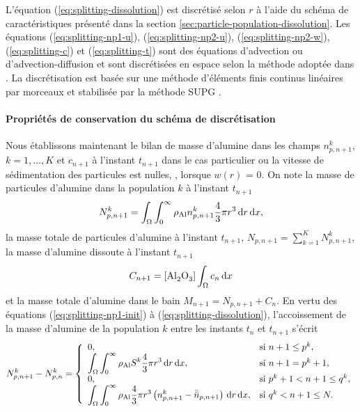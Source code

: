 L'équation (\ref{eq:splitting-dissolution}) est discrétisé selon $r$ à
l'aide du schéma de caractéristiques présenté dans la section
\ref{sec:particle-population-dissolution}. Les équations
(\ref{eq:splitting-np1-u}), (\ref{eq:splitting-np2-u}),
(\ref{eq:splitting-np2-w}), (\ref{eq:splitting-c}) et
(\ref{eq:splitting-t}) sont des équations d'advection ou
d'advection-diffusion et sont discrétisées en espace selon la méthode
adoptée dans \cite{Hofer2011}. La discrétisation est basée sur une
méthode d'éléments finis continus linéaires par morceaux et stabilisée
par la méthode SUPG \cite{Quarteroni2008}.

\paragraph{Propriétés de conservation du schéma de discrétisation}
Nous établissons maintenant le bilan de masse d'alumine dans les
champs $n_{p,n+1}^k$, $k = 1,\dots, K$ et $c_{n+1}$ à l'instant
$t_{n+1}$ dans le cas particulier ou la vitesse de sédimentation des
particules est nulles, \ie, lorsque $w(r)$ = 0. On note la masse
de particules d'alumine dans la population $k$ à l'instant $t_{n+1}$
\begin{equation}\label{eq:np-masse-def}
  N_{p,n+1}^k = \int_\Omega\int_0^\infty \rho_\mathrm{Al}
  n_{p,n+1}^k\frac{4}{3}\pi r^3\,\mathrm dr\,\mathrm dx,
\end{equation}
la masse totale de particules d'alumine à l'instant $t_{n+1}$, $N_{p,n+1} =
\sum_{k = 1}^K N_{p,n+1}^k$, la masse d'alumine dissoute à l'instant $t_{n+1}$
\begin{equation}\label{eq:c-masse-def}
  C_{n+1} = [\cee{Al2O3}]\int_\Omega c_n\intd{x}
\end{equation}
et la masse totale d'alumine dans le bain $M_{n+1} = N_{p,n+1} +
C_n$. En vertu des équations (\ref{eq:splitting-np1-init}) à
(\ref{eq:splitting-dissolution}), l'accoissement de la masse d'alumine
de la population $k$ entre les instants $t_{n}$ et $t_{n + 1}$ s'écrit
\begin{equation}\label{eq:np-accr}
  N_{p,n+1}^k - N_{p,n}^k = \left\{
  \begin{array}{ll}
    0, & \text{si }n+1 \leq p^k, \\
    \displaystyle\int_\Omega\displaystyle\int_0^\infty \rho_\mathrm{Al} S^k\frac{4}{3}\pi
    r^3\,\mathrm dr\,\mathrm dx, & \text{si }n+1 = p^k + 1, \\
    0, & \text{si }p^k+1 < n+1 \leq q^k, \\
    \displaystyle\int_\Omega\displaystyle\int_0^\infty \rho_\mathrm{Al} \frac{4}{3}\pi
    r^3\left( n_{p,n+1}^k - \bar{\bar n}_{p,n+1} \right)\,\mathrm dr\,\mathrm dx, &\text{si } q^k < n+1 \leq N.
  \end{array}
  \right.
\end{equation}
